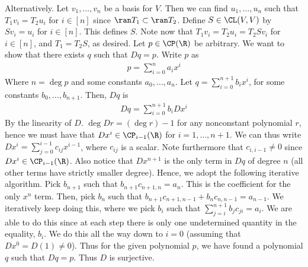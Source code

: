 \documentclass{book}
\begin{document}
\begin{enumerate}[label=\arabic*)]
      Alternatively. Let $v_1, \dots, v_n$ be a basis for $V$. Then we can find $u_1, \dots, u_n$ such that $T_1v_i = T_2u_i$ for $i \in [n]$ since $\ran T_1 \subset \ran T_2$. Define $S \in
      \CL(V, V)$ by $Sv_i = u_i$ for $i \in [n]$. This defines $S$. Note now that $T_1v_i = T_2u_i = T_2Sv_i$ for $i \in [n]$, and $T_1 = T_2S$, as desired.
    \ii
      Let $p \in \CP(\R)$ be arbitrary. We want to show that there exists $q$ such that $Dq = p$. Write $p$ as 
      \begin{align*}
        p = \sum_{i = 0}^{n}a_ix^i
      \end{align*}
      Where $n = \deg p$ and some constants $a_0, \dots, a_n$. Let $q = \sum_{i = 0}^{n + 1}b_ix^i$, for some constants $b_0, \dots, b_{n + 1}$. Then, $Dq$ is
      \begin{align*}
        Dq = \sum_{i = 0}^{n + 1}b_iDx^i
      \end{align*}
      By the linearity of $D$. $\deg Dr = (\deg r) - 1$ for any nonconstant polynomial $r$, hence we must have that $Dx^{i} \in \CP_{i - 1}(\R)$ for $i = 1, \dots, n + 1$. We can thus write
      $Dx^{i} = \sum_{j = 0}^{i - 1}c_{ij}x^{i - 1}$, where $c_{ij}$ is a scalar. Note furthermore that $c_{i,i-1} \neq 0$ since $Dx^{i} \in \CP_{i - 1}(\R)$. Also notice that $Dx^{n + 1}$
      is the only term in $Dq$ of degree $n$ (all other terms have strictly smaller degree). Hence, we adopt the following iterative algorithm. Pick $b_{n + 1}$ such that $b_{n + 1}c_{n +
      1,n} = a_n$. This is the coefficient for the only $x^n$ term. Then, pick $b_{n}$ such that $b_{n + 1}c_{n + 1,n - 1} + b_{n}c_{n, n - 1} = a_{n - 1}$. We iteratively keep doing this,
      where we pick $b_i$ such that $\sum_{j = i}^{n + 1}b_jc_{ji} = a_{i}$. We are able to do this since at each step there is only one undetermined quantity in the equality, $b_i$. We do
      this all the way down to $i = 0$ (assuming that $Dx^{0} = D(1) \neq 0$). Thus for the given polynomial $p$, we have found a polynomial $q$ such that $Dq = p$. Thus $D$ is surjective.


\end{enumerate}
\end{document}
